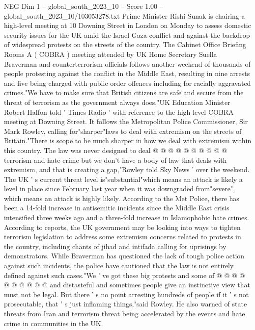 \begin{textsample}{NEG Dim 1 – global\_south\_2023\_10 – Score 1.00 – global\_south\_2023\_10/103053278.txt}  \label{ex:f1_neg_405}
Prime Minister Rishi Sunak is chairing a high-level meeting at 10 Downing Street in London on Monday to assess domestic security issues for the UK amid the Israel-Gaza conflict and against the backdrop of widespread protests on the streets of the country.
The Cabinet Office Briefing Rooms A ( COBRA ) meeting attended by UK Home Secretary Suella Braverman and counterterrorism officials follows another weekend of thousands of people protesting against the conflict in the Middle East, resulting in nine arrests and five being charged with public order offences including for racially aggravated crimes."We have to make sure that British citizens are safe and secure from the threat of terrorism as the government always does,"UK Education Minister Robert Halfon told ' Times Radio ' with reference to the high-level COBRA meeting at Downing Street.
It follows the Metropolitan Police Commissioner, Sir Mark Rowley, calling for"sharper"laws to deal with extremism on the streets of Britain."There is scope to be much sharper in how we deal with extremism within this country.
The law was never designed to deal @ @ @ @ @ @ @ @ @ @ terrorism and hate crime but we don't have a body of law that deals with extremism, and that is creating a gap,"Rowley told Sky News ' over the weekend.
The UK ' s current threat level is"substantial"which means an attack is likely a level in place since February last year when it was downgraded from"severe", which means an attack is highly likely.
According to the Met Police, there has been a 14-fold increase in antisemitic incidents since the Middle East crisis intensified three weeks ago and a three-fold increase in Islamophobic hate crimes.
According to reports, the UK government may be looking into ways to tighten terrorism legislation to address some extremism concerns related to protests in the country, including chants of jihad and intifada calling for uprisings by demonstrators.
While Braverman has questioned the lack of tough police action against such incidents, the police have cautioned that the law is not entirely defined against such cases."We ' ve got these big protests and some of @ @ @ @ @ @ @ @ @ @ and distasteful and sometimes people give an instinctive view that must not be legal.
But there ' s no point arresting hundreds of people if it ' s not prosecutable, that ' s just inflaming things,"said Rowley.
He also warned of state threats from Iran and terrorism threat being accelerated by the events and hate crime in communities in the UK.

\end{textsample}
